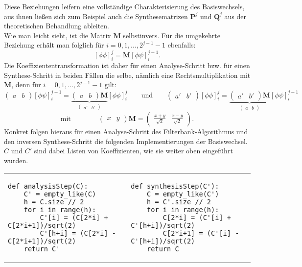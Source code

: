 %
Diese Beziehungen leifern eine vollständige Charakterisierung des Basiswechsels, aus ihnen ließen sich zum Beispiel auch die Synthesematrizen $\mathbf{P}^j$ und $\mathbf{Q}^j$ aus der theoretischen Behandlung ableiten.\\
Wie man leicht sieht, ist die Matrix $\mathbf{M}$ selbstinvers. Für die umgekehrte Beziehung erhält man folglich für $i = 0, 1, ..., 2^{j-1}-1$ ebenfalls:
%
\[
\left[ \phi\phi \right]_{i}^j
=
\mathbf{M}
\left[ \phi\psi \right]_{i}^{j-1}
.
\]
%
Die Koeffiziententransformation ist daher für einen Analyse-Schritt bzw. für einen Synthese-Schritt in beiden Fällen die selbe, nämlich eine Rechtsmultiplikation mit $\mathbf{M}$, denn für $i = 0, 1, ..., 2^{j-1}-1$ gilt:
%
\[
\begin{pmatrix}
a & b
\end{pmatrix}
\left[ \phi\psi \right]_{i}^{j-1}
=
\underbrace{
\begin{pmatrix}
a & b
\end{pmatrix}
\mathbf{M}
}_{
\begin{pmatrix}
a' & b'
\end{pmatrix}
}
\left[ \phi\phi \right]_{i}^j
\qquad \mbox{und} \qquad
\begin{pmatrix}
a' & b'
\end{pmatrix}
\left[ \phi\phi \right]_{i}^j
=
\underbrace{
\begin{pmatrix}
a' & b'
\end{pmatrix}
\mathbf{M}
}_{
\begin{pmatrix}
a & b
\end{pmatrix}
}
\left[ \phi\psi \right]_{i}^{j-1}
\]
%
\[
\mbox{mit} \qquad \qquad
\begin{pmatrix}
x & y
\end{pmatrix}
\mathbf{M}
=
\begin{pmatrix}
\frac{x+y}{\sqrt{2}} & \frac{x-y}{\sqrt{2}}
\end{pmatrix}
.
\]
%
Konkret folgen hieraus für einen Analyse-Schritt des Filterbank-Algorithmus und den inversen Synthese-Schritt die folgenden Implementierungen der Basiswechsel. $C$ und $C'$ sind dabei Listen von Koeffizienten, wie sie weiter oben eingeführt wurden.

\begin{adjustbox}{max width=\textwidth ,center}
\begin{tabular}{p{}|p{}}
\begin{verbatim}
def analysisStep(C):
    C' = empty_like(C)
    h = C.size // 2
    for i in range(h):
        C'[i] = (C[2*i] + C[2*i+1])/sqrt(2)
        C'[h+i] = (C[2*i] - C[2*i+1])/sqrt(2)
    return C'
\end{verbatim}
&
\begin{verbatim}
def synthesisStep(C'):
    C = empty_like(C')
    h = C'.size // 2
    for i in range(h):
        C[2*i] = (C'[i] + C'[h+i])/sqrt(2)
        C[2*i+1] = (C'[i] - C'[h+i])/sqrt(2)
    return C
\end{verbatim}
\\
\end{tabular}
\end{adjustbox}

